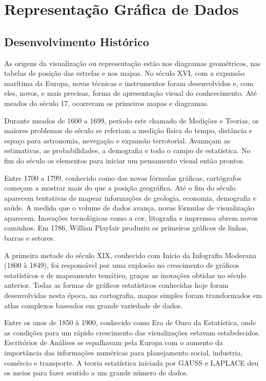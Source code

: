 \chapter{Representação Gráfica de Dados}

\section{Desenvolvimento Histórico}

\inic As origens da visualização ou representação estão nos diagramas geométricos, nas tabelas de posição das estrelas e nos mapas. No século XVI, com a expansão marítima da Europa, novas técnicas e instrumentos foram desenvolvidos e, com eles, novos, e mais precisas, forma de apresentação visual do conhcecimento. Até meados do século 17, ocorreram os primeiros mapas e diagramas.\vskip0.3cm

\inic Durante meados de 1600 a 1699, período este chamado de Medições e Teorias, os maiores problemas do século se referiam a medição física do tempo, distância e espaço para astronomia, nevegação e expansão terrotorial. Avannçam as estimativas, as probabilidades, a demografia e todo o campo de estatística. No fim do século os elementos para iniciar um pensamento visual então prontos. \vskip0.3cm


\inic Entre 1700 a 1799, conhecido como das novas fórmulas gráficas, cartógrafos começam a mostrar mais do que a posição geográfica. Até o fim do século aparecem tentativas de mapear informações de geologia, economia, demografia e saúde. A medida que o volume de dados avança, novas fórmulas de visualização aparecem. Inovações tecnológicas como a cor, litografia e imprenssa abrem novos caminhos. Em 1786, Willian Playfair produziu os primeiros gráficos de linhas, barras e setores.
\vskip0.3cm


\inic A primeira metade do século XIX, conhecido com Início da Infografia Moderana (1800 à 1849), foi responsável por uma explosão no crescimento de gráficos estatísticos e de mapeamento temático, graças as inovações obtidas no século anterior. Todas as formas de gráficos estatísticos conhecidas hoje foram desenvolvidas nesta época, na cartografia, mapas simples foram transformados em atlas complexos baseados em grande variedade de dados.  
\vskip0.3cm

\inic Entre os anos de 1850 à 1900, conhecido como Era de Ouro da Estatística, onde as condições para um rápido crescimento das visualizações estavam estabelecidos. Escritórios de Análises se espalhavam pela Europa com o aumento da importância das informações numéricas para planejamento social, industria, comércio e transporte. A teoria estatística iniciada por GAUSS e LAPLACE deu os meios para fazer sentido a um grande número de dados.  
\vskip0.3cm 


